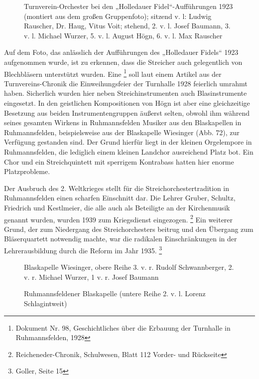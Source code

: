 \begin{figure}
\caption{Turnverein-Orchester bei den „Holledauer Fidel“-Aufführungen
1923 (montiert aus dem großen Gruppenfoto); sitzend v. l: Ludwig
Rauscher, Dr. Haug, Vitus Voit; stehend, 2. v. l. Josef Baumann, 3. v.
l. Michael Wurzer, 5. v. l. August Högn, 6. v. l. Max Rauscher}
\end{figure}

Auf dem Foto, das anlässlich der Aufführungen des „Holledauer Fidels“
1923 aufgenommen wurde, ist zu erkennen, dass die Streicher auch
gelegentlich von Blechbläsern unterstützt wurden. Eine
  \footnote{Dokument Nr. 98, Geschichtliches über die Erbauung
der Turnhalle in Ruhmannsfelden, 1928} soll laut einem Artikel aus der
Turnvereins-Chronik die Einweihungsfeier der Turnhalle 1928 feierlich
umrahmt haben. Sicherlich wurden hier neben Streichinstrumenten auch
Blasinstrumente eingesetzt. In den geistlichen Kompositionen von Högn
ist aber eine gleichzeitige Besetzung aus beiden Instrumentengruppen
äußerst selten, obwohl ihm während seines gesamten Wirkens in
Ruhmannsfelden Musiker aus den Blaskapellen in Ruhmannsfelden,
beispielsweise aus der Blaskapelle Wiesinger (Abb. 72), zur Verfügung
gestanden sind. Der Grund hierfür liegt in der kleinen Orgelempore in
Ruhmannsfelden, die lediglich einem kleinen Landchor ausreichend Platz
bot. Ein Chor und ein Streichquintett mit sperrigem Kontrabass hatten
hier enorme Platzprobleme.

Der Ausbruch des 2. Weltkrieges stellt für die Streichorchestertradition
in Ruhmannsfelden einen scharfen Einschnitt dar. Die Lehrer Gruber,
Schultz, Friedrich und Kestlmeier, die alle auch als Beteiligte an der
Kirchenmusik genannt wurden, wurden 1939 zum Kriegsdienst
eingezogen. \footnote{Reicheneder-Chronik, Schulwesen, Blatt 112
Vorder- und Rückseite} Ein weiterer Grund, der zum Niedergang des
Streichorchesters beitrug und den Übergang zum Bläserquartett notwendig
machte, war die radikalen Einschränkungen in der Lehrerausbildung durch
die Reform im Jahr 1935. \footnote{Goller, Seite 15}

\begin{figure}
\caption{Blaskapelle Wiesinger, obere Reihe 3. v. r. Rudolf
Schwannberger, 2. v. r. Michael Wurzer, 1 v. r. Josef Baumann}
\end{figure}

\begin{figure}
\caption{Ruhmannsfeldener Blaskapelle (untere Reihe 2. v. l. Lorenz
Schlagintweit)}
\end{figure}

